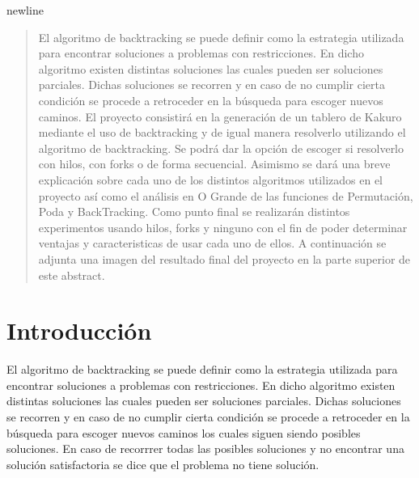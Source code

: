 \documentclass[conference]{IEEEtran}
\begin{document}
newline\newline\newline\newline\newline\newline\newline\newline\newline\newline\newline
\begin{abstract}
	El algoritmo de backtracking se puede definir como la estrategia utilizada para encontrar soluciones a problemas con restricciones. En dicho algoritmo existen distintas soluciones las cuales pueden ser soluciones parciales. Dichas soluciones se recorren  y en caso de no cumplir cierta condición se procede a retroceder en la búsqueda para escoger nuevos caminos. El proyecto consistirá en la generación de un tablero de Kakuro mediante el uso de backtracking y de igual manera resolverlo utilizando el algoritmo de backtracking. Se podrá dar la opción de escoger si resolverlo con hilos, con forks o de forma secuencial. Asimismo se dará una breve explicación sobre cada uno de los distintos algoritmos utilizados en el proyecto así como el análisis en O Grande de las funciones de Permutación, Poda y BackTracking. Como punto final se realizarán distintos experimentos usando hilos, forks y ninguno con el fin de poder determinar ventajas y caracteristicas de usar cada uno de ellos. A continuación se adjunta una imagen del resultado final del proyecto en la parte superior de este abstract.
\end{abstract}





%
\IEEEpeerreviewmaketitle


\section{Introducción}
El algoritmo de backtracking se puede definir como la estrategia utilizada para encontrar soluciones a problemas con restricciones. En dicho algoritmo existen distintas soluciones las cuales pueden ser soluciones parciales. Dichas soluciones se recorren  y en caso de no cumplir cierta condición se procede a retroceder en la búsqueda para escoger nuevos caminos los cuales siguen siendo posibles soluciones. En caso de recorrrer todas las posibles soluciones y no encontrar una solución satisfactoria se dice que el problema no tiene solución.
\end{document}
